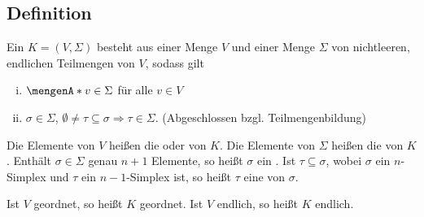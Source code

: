 \subsection[Definition: Simplizialer Komplex]{Definition} %
\label{sub:22}
Ein  $K=(V, \Sigma)$ besteht aus einer Menge $V$ und einer Menge $\Sigma$ von nichtleeren, endlichen Teilmengen von $V$, sodass gilt
\begin{enumerate}[(i)]
	\item $\set{v} \in \Sigma$ für alle $v \in V$
	\item $\sigma \in \Sigma$, $\emptyset \not= \tau \subseteq \sigma \Longrightarrow \tau \in\Sigma.$ \hfill {\footnotesize(Abgeschlossen bzgl. Teilmengenbildung)}
\end{enumerate}
Die Elemente von $V$ heißen die  oder  von $K$. Die Elemente von $\Sigma$ heißen die  von $K$. Enthält $\sigma \in \Sigma$ 
genau $n+1$ Elemente, so heißt $\sigma$ ein . Ist $\tau \subseteq \sigma$, wobei $\sigma$ ein $n$-Simplex und $\tau$ 
ein $n-1$-Simplex ist, so heißt $\tau$ eine  von $\sigma$. 

\noindent Ist $V$ geordnet, so heißt $K$ geordnet. Ist $V$ endlich, so heißt $K$ endlich.

